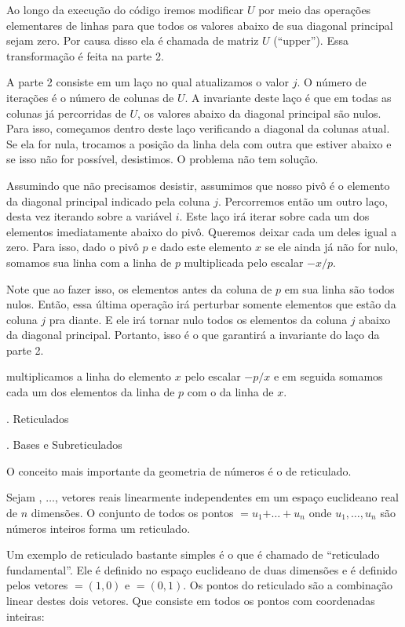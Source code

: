 Ao longo da execução do código iremos modificar $U$ por meio
das operações elementares de linhas para que todos os valores abaixo
de sua diagonal principal sejam zero. Por causa disso ela é chamada de
matriz $U$ (``upper''). Essa transformação é feita na parte 2.

A parte 2 consiste em um laço no qual atualizamos o valor $j$. O
número de iterações é o número de colunas de $U$. A invariante deste
laço é que em todas as colunas já percorridas de $U$, os valores
abaixo da diagonal principal são nulos. Para isso, começamos dentro
deste laço verificando a diagonal da colunas atual. Se ela for nula,
trocamos a posição da linha dela com outra que estiver abaixo e se
isso não for possível, desistimos. O problema não tem solução.

Assumindo que não precisamos desistir, assumimos que nosso pivô é o
elemento da diagonal principal indicado pela coluna $j$. Percorremos
então um outro laço, desta vez iterando sobre a variável $i$. Este
laço irá iterar sobre cada um dos elementos imediatamente abaixo do
pivô. Queremos deixar cada um deles igual a zero. Para isso, dado o
pivô $p$ e dado este elemento $x$ se ele ainda já não for nulo,
somamos sua linha com a linha de $p$ multiplicada pelo escalar $-x/p$.

Note que ao fazer isso, os elementos antes da coluna de $p$ em sua
linha são todos nulos. Então, essa última operação irá perturbar
somente elementos que estão da coluna $j$ pra diante. E ele irá tornar
nulo todos os elementos da coluna $j$ abaixo da diagonal
principal. Portanto, isso é o que garantirá a invariante do laço da
parte 2.


multiplicamos a linha do elemento $x$ pelo escalar $-p/x$ e em seguida
somamos cada um dos elementos da linha de $p$ com o da linha de $x$.


{\twelvebold {}. Reticulados}


\vskip0.5cm

{\tenbold{}. Bases e Subreticulados}

O conceito mais importante da geometria de números é o de reticulado.

Sejam , $\ldots$,  vetores reais linearmente
independentes em um espaço euclideano real de $n$ dimensões. O
conjunto de todos os pontos
$=u_1$$+\ldots+u_n$ onde $u_1, \ldots,
u_n$ são números inteiros forma um reticulado.

Um exemplo de reticulado bastante simples é o que é chamado de
``reticulado fundamental''. Ele é definido no espaço euclideano de
duas dimensões e é definido pelos vetores $=(1, 0)$ e
$=(0,1)$. Os pontos do reticulado são a combinação linear
destes dois vetores. Que consiste em todos os pontos com coordenadas
inteiras:

